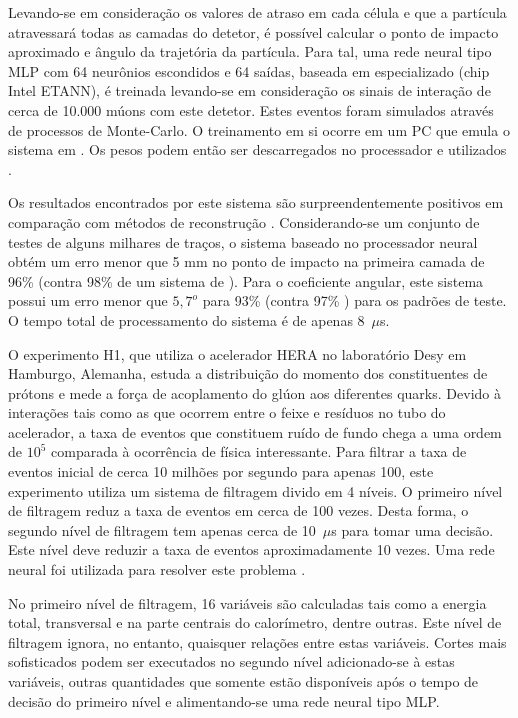 Levando-se em consideração os valores de atraso em cada célula e que a
partícula atravessará todas as camadas do detetor, é possível calcular o ponto
de impacto aproximado e ângulo da trajetória da partícula. Para tal, uma
rede neural tipo MLP com 64 neurônios escondidos e 64 saídas, baseada em
 especializado (chip Intel ETANN), é treinada levando-se em
consideração os sinais de interação de cerca de 10.000 múons com este
detetor. Estes eventos foram simulados através de processos de Monte-Carlo. O
treinamento em si ocorre em um PC que emula o sistema em . Os
pesos podem então ser descarregados no processador e utilizados
.

Os resultados encontrados por este sistema são surpreendentemente positivos em
comparação com métodos de reconstrução . Considerando-se um
conjunto de testes de alguns milhares de traços, o sistema baseado no
processador neural obtém um erro menor que 5 mm no ponto de impacto na
primeira camada de 96\% (contra 98\% de um sistema de 
). Para o coeficiente angular, este sistema possui um erro menor
que $5,7^{o}$ para 93\% (contra 97\% ) para os padrões de
teste. O tempo total de processamento do sistema é de apenas 8~$\mu$s.

O experimento H1, que utiliza o acelerador HERA no laboratório Desy em
Hamburgo, Alemanha, estuda a distribuição do momento dos constituentes de
prótons e mede a força de acoplamento do glúon aos diferentes quarks. Devido à
interações tais como as que ocorrem entre o feixe e resíduos no tubo do
acelerador, a taxa de eventos que constituem ruído de fundo chega a uma ordem
de $10^5$ comparada à ocorrência de física interessante. Para filtrar a taxa
de eventos inicial de cerca 10 milhões por segundo para apenas 100, este
experimento utiliza um sistema de filtragem divido em 4 níveis. O primeiro
nível de filtragem reduz a taxa de eventos em cerca de 100 vezes. Desta forma,
o segundo nível de filtragem tem apenas cerca de 10~$\mu$s para tomar uma
decisão. Este nível deve reduzir a taxa de eventos aproximadamente 10
vezes. Uma rede neural foi utilizada para resolver este problema
\cite{kohne-nim-1997}. 

No primeiro nível de filtragem, 16 variáveis são calculadas tais como a
energia total, transversal e na parte centrais do calorímetro, dentre
outras. Este nível de filtragem ignora, no entanto, quaisquer relações entre
estas variáveis. Cortes mais sofisticados podem ser executados no segundo
nível adicionado-se à estas variáveis, outras quantidades que somente estão
disponíveis após o tempo de decisão do primeiro nível e alimentando-se uma
rede neural tipo MLP. 

